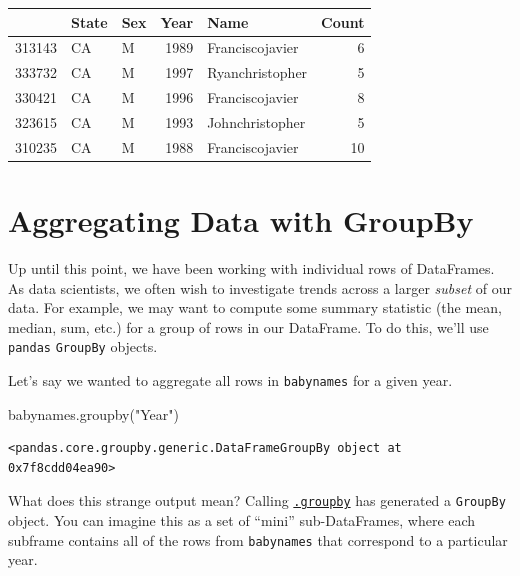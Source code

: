 \documentclass[
  letterpaper,
  DIV=11,
  numbers=noendperiod]{scrreprt}
\newenvironment{Shaded}{\begin{snugshade}}{\end{snugshade}}
\newcommand{\NormalTok}[1]{\textcolor[rgb]{0.00,0.23,0.31}{#1}}
\newcommand{\StringTok}[1]{\textcolor[rgb]{0.13,0.47,0.30}{#1}}
\begin{document}
\begin{tabular}{lllrlr}
\toprule
{} & State & Sex &  Year &             Name &  Count \\
\midrule
313143 &    CA &   M &  1989 &  Franciscojavier &      6 \\
333732 &    CA &   M &  1997 &  Ryanchristopher &      5 \\
330421 &    CA &   M &  1996 &  Franciscojavier &      8 \\
323615 &    CA &   M &  1993 &  Johnchristopher &      5 \\
310235 &    CA &   M &  1988 &  Franciscojavier &     10 \\
\bottomrule
\end{tabular}

\hypertarget{aggregating-data-with-groupby}{%
\section{Aggregating Data with
GroupBy}\label{aggregating-data-with-groupby}}

Up until this point, we have been working with individual rows of
DataFrames. As data scientists, we often wish to investigate trends
across a larger \emph{subset} of our data. For example, we may want to
compute some summary statistic (the mean, median, sum, etc.) for a group
of rows in our DataFrame. To do this, we'll use \texttt{pandas}
\texttt{GroupBy} objects.

Let's say we wanted to aggregate all rows in \texttt{babynames} for a
given year.

\begin{Shaded}
\begin{Highlighting}[]
\NormalTok{babynames.groupby(}\StringTok{"Year"}\NormalTok{)}
\end{Highlighting}
\end{Shaded}

\begin{verbatim}
<pandas.core.groupby.generic.DataFrameGroupBy object at 0x7f8cdd04ea90>
\end{verbatim}

What does this strange output mean? Calling
\href{https://pandas.pydata.org/pandas-docs/stable/reference/api/pandas.DataFrame.groupby.html}{\texttt{.groupby}}
has generated a \texttt{GroupBy} object. You can imagine this as a set
of ``mini'' sub-DataFrames, where each subframe contains all of the rows
from \texttt{babynames} that correspond to a particular year.
\end{document}
